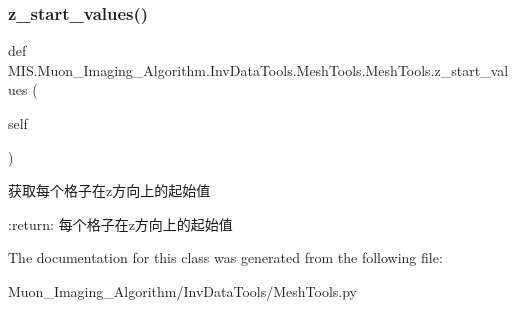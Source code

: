 \subsubsection{\texorpdfstring{z\+\_\+start\+\_\+values()}{z\_start\_values()}}
{\footnotesize\ttfamily def M\+I\+S.\+Muon\+\_\+\+Imaging\+\_\+\+Algorithm.\+Inv\+Data\+Tools.\+Mesh\+Tools.\+Mesh\+Tools.\+z\+\_\+start\+\_\+values (\begin{DoxyParamCaption}\item[{}]{self }\end{DoxyParamCaption})}

\begin{DoxyVerb}获取每个格子在z方向上的起始值

:return: 每个格子在z方向上的起始值
\end{DoxyVerb}
 

The documentation for this class was generated from the following file\+:\begin{DoxyCompactItemize}
\item 
Muon\+\_\+\+Imaging\+\_\+\+Algorithm/\+Inv\+Data\+Tools/Mesh\+Tools.\+py\end{DoxyCompactItemize}
